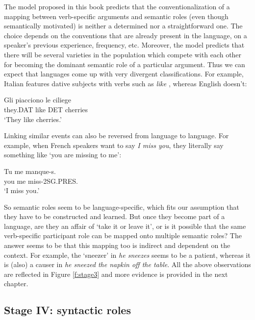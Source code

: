 The model proposed in this book predicts that the conventionalization of a mapping between verb-specific arguments and semantic roles (even though semantically motivated) is neither a determined nor a straightforward one. The choice depends on the conventions that are already present in the language, on a speaker's previous experience, frequency, etc. Moreover, the model predicts that there will be several varieties in the population which compete with each other for becoming the dominant semantic role of a particular argument. Thus we can expect that languages come up with very divergent classifications. For example, Italian features dative subjects with verbs such as {\em like} \citep[27]{palmer94grammatical}, whereas English doesn't:

\ea
\gll Gli piacciono le ciliege \\
they.DAT like DET cherries \\
\glt `They like cherries.'  \\
\z


Linking similar events can also be reversed from language to language. For example, when French speakers want to say {\em I miss you}, they literally say something like `you are missing to me':

\ea
\gll Tu me manque-s. \\
you me miss-2SG.PRES. \\
\glt `I miss you.' \\
\z


So semantic roles seem to be language-specific, which fits our assumption that they have to be constructed and learned. But once they become part of a language, are they an affair of `take it or leave it', or is it possible that the same verb-specific participant role can be mapped onto multiple semantic roles? The answer seems to be that this mapping too is indirect and dependent on the context. For example, the `sneezer' in {\em he sneezes} seems to be a patient, whereas it is (also) a causer in {\em he sneezed the napkin off the table}. All the above observations are reflected in Figure \ref{f:stage3} and more evidence is provided in the next chapter.

\subsection{Stage IV: syntactic roles}
\label{s:stage4}

